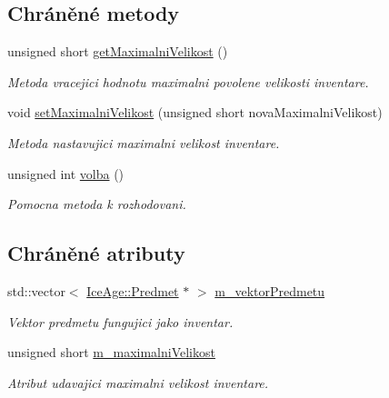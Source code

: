 \subsection*{Chráněné metody}
\begin{DoxyCompactItemize}
\item 
unsigned short \hyperlink{classIceAge_1_1Inventar_a8a8f2cf0fd978a5828b640c24db95e34}{get\+Maximalni\+Velikost} ()
\begin{DoxyCompactList}\small\item\em Metoda vracejici hodnotu maximalni povolene velikosti inventare. \end{DoxyCompactList}\item 
void \hyperlink{classIceAge_1_1Inventar_afb8e76dad857120f3eb3ae5a35650b02}{set\+Maximalni\+Velikost} (unsigned short nova\+Maximalni\+Velikost)
\begin{DoxyCompactList}\small\item\em Metoda nastavujici maximalni velikost inventare. \end{DoxyCompactList}\item 
unsigned int \hyperlink{classIceAge_1_1Inventar_a2598e120dd0cba29a7d9e70dc29495e8}{volba} ()
\begin{DoxyCompactList}\small\item\em Pomocna metoda k rozhodovani. \end{DoxyCompactList}\end{DoxyCompactItemize}
\subsection*{Chráněné atributy}
\begin{DoxyCompactItemize}
\item 
std\+::vector$<$ \hyperlink{classIceAge_1_1Predmet}{Ice\+Age\+::\+Predmet} $\ast$ $>$ \hyperlink{classIceAge_1_1Inventar_a0cceae841e70c3db31b3331d4eb075ba}{m\+\_\+vektor\+Predmetu}
\begin{DoxyCompactList}\small\item\em Vektor predmetu fungujici jako inventar. \end{DoxyCompactList}\item 
unsigned short \hyperlink{classIceAge_1_1Inventar_ad45fb3c8b53eb431f3e212e5951b4623}{m\+\_\+maximalni\+Velikost}
\begin{DoxyCompactList}\small\item\em Atribut udavajici maximalni velikost inventare. \end{DoxyCompactList}\end{DoxyCompactItemize}



